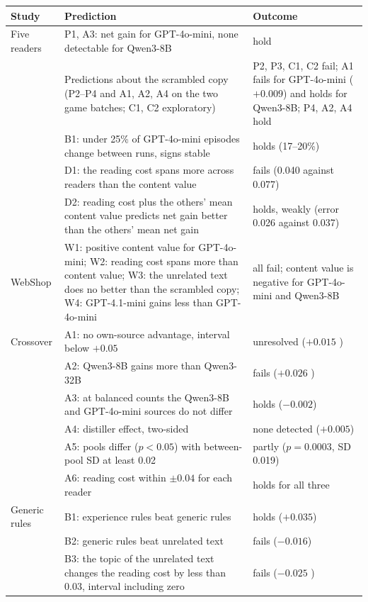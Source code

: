 \begin{table}[t]
\centering
\small
\setlength{\tabcolsep}{4pt}
\renewcommand{\arraystretch}{1.15}
\begin{tabular}{@{}L{0.13\textwidth}L{0.53\textwidth}L{0.29\textwidth}@{}}
\toprule
Study & Prediction & Outcome \\
\midrule
Five readers & P1, A3: net gain for GPT-4o-mini, none detectable for Qwen3-8B & hold \\
 & Predictions about the scrambled copy (P2--P4 and A1, A2, A4 on the two game batches; C1, C2 exploratory) & P2, P3, C1, C2 fail; A1 fails for GPT-4o-mini ($+0.009$) and holds for Qwen3-8B; P4, A2, A4 hold \\
 & B1: under 25\% of GPT-4o-mini episodes change between runs, signs stable & holds (17--20\%) \\
 & D1: the reading cost spans more across readers than the content value & fails (0.040 against 0.077) \\
 & D2: reading cost plus the others' mean content value predicts net gain better than the others' mean net gain & holds, weakly (error 0.026 against 0.037) \\
WebShop & W1: positive content value for GPT-4o-mini; W2: reading cost spans more than content value; W3: the unrelated text does no better than the scrambled copy; W4: GPT-4.1-mini gains less than GPT-4o-mini & all fail; content value is negative for GPT-4o-mini and Qwen3-8B \\
Crossover & A1: no own-source advantage, interval below $+0.05$ & unresolved ($+0.015$ ) \\
 & A2: Qwen3-8B gains more than Qwen3-32B & fails ($+0.026$ ) \\
 & A3: at balanced counts the Qwen3-8B and GPT-4o-mini sources do not differ & holds ($-0.002$) \\
 & A4: distiller effect, two-sided & none detected ($+0.005$) \\
 & A5: pools differ ($p<0.05$) with between-pool SD at least 0.02 & partly ($p=0.0003$, SD 0.019) \\
 & A6: reading cost within $\pm0.04$ for each reader & holds for all three \\
Generic rules & B1: experience rules beat generic rules & holds ($+0.035$) \\
 & B2: generic rules beat unrelated text & fails ($-0.016$) \\
 & B3: the topic of the unrelated text changes the reading cost by less than 0.03, interval including zero & fails ($-0.025$ ) \\

\end{tabular}
\end{table}
